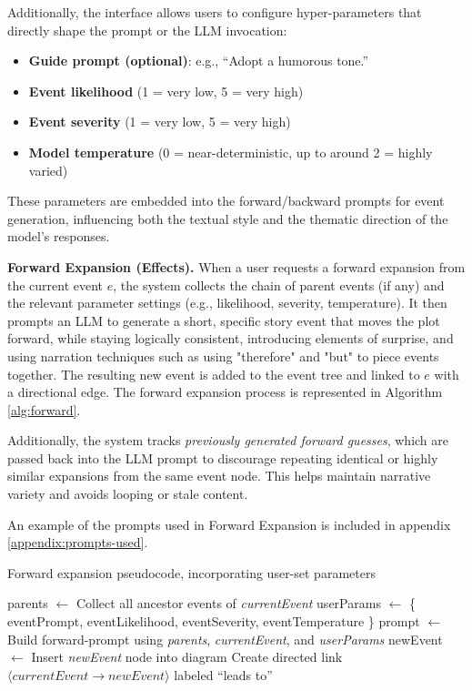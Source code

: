 \documentclass[11pt]{article}
\begin{document}
Additionally, the interface allows users to configure hyper-parameters that directly shape the prompt or the LLM invocation:
\begin{itemize}
    \item \textbf{Guide prompt (optional)}: e.g., ``Adopt a humorous tone.''
    \item \textbf{Event likelihood} (1 = very low, 5 = very high)
    \item \textbf{Event severity} (1 = very low, 5 = very high)
    \item \textbf{Model temperature} (0 = near-deterministic, up to around 2 = highly varied)
\end{itemize}
These parameters are embedded into the forward/backward prompts for event generation, influencing both the textual style and the thematic direction of the model's responses.

\textbf{Forward Expansion (Effects).}
When a user requests a forward expansion from the current event \( e \), the system collects the chain of parent events (if any) and the relevant parameter settings (e.g., likelihood, severity, temperature). It then prompts an LLM to generate a short, specific story event that moves the plot forward, while staying logically consistent, introducing elements of surprise, and using narration techniques such as using "therefore" and "but" to piece events together. The resulting new event is added to the event tree and linked to \( e \) with a directional edge. The forward expansion process is represented in Algorithm \ref{alg:forward}.

Additionally, the system tracks \emph{previously generated forward guesses}, which are passed back into the LLM prompt to discourage repeating identical or highly similar expansions from the same event node. This helps maintain narrative variety and avoids looping or stale content. 

An example of the prompts used in Forward Expansion is included in appendix \ref{appendix:prompts-used}.

\begin{algorithm}[ht]
\caption{Forward expansion pseudocode, incorporating user-set parameters}
\label{alg:forward}
\begin{algorithmic}[1]
    \State parents \(\gets\) Collect all ancestor events of \textit{currentEvent}
    \State userParams \(\gets\) \{ eventPrompt, eventLikelihood, eventSeverity, eventTemperature \}
    \State prompt \(\gets\) Build forward-prompt using \textit{parents}, \textit{currentEvent}, and \textit{userParams}
    \State newEvent \(\gets\) 
    \State Insert \textit{newEvent} node into diagram
    \State Create directed link \(\langle currentEvent \to newEvent \rangle\) labeled ``leads to''
\EndFunction
\end{algorithmic}
\end{algorithm}
\label{fig:forward-expansion}
\end{document}
